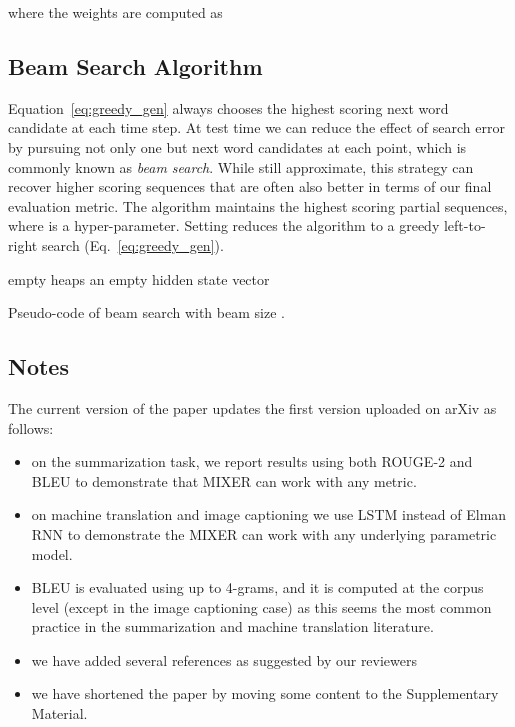 \documentclass{article} \usepackage{iclr2016_conference,times}
\begin{document}
where the weights  are computed as 




\subsection{Beam Search Algorithm}
\label{sup-material:beam_search}
Equation~\ref{eq:greedy_gen} always chooses the highest scoring next word candidate
at each time step. At test time we can reduce the effect of search error 
by pursuing not only one but  next word candidates at each point, which 
is commonly known as {\it beam search}.
While still approximate, this strategy can recover higher scoring sequences 
that are often also better in terms of our final evaluation metric.
The algorithm maintains the  highest scoring partial
sequences, where  is a hyper-parameter.
Setting  reduces the algorithm to a greedy left-to-right search 
(Eq.~\eqref{eq:greedy_gen}). 
\begin{algorithm}[!h]
  empty heaps \;
  an empty hidden state vector \;
  \;
  \;
  \KwOut{}
 
 \caption{Pseudo-code of beam search with beam size .}
  \label{alg:beam} 
\end{algorithm}


\newpage






\subsection{Notes}
The current version of the paper updates the first version uploaded on arXiv as follows:
\begin{itemize}
\item on the summarization task, we report results using both ROUGE-2 and BLEU to demonstrate that MIXER can work with any metric.
\item on machine translation and image captioning we use LSTM instead of Elman RNN to demonstrate the MIXER can work with any underlying parametric model.
\item BLEU is evaluated using up to 4-grams, and it is computed at the corpus level (except in the image captioning case) as this seems the most common practice
in the summarization and machine translation literature.
\item we have added several references as suggested by our reviewers
\item we have shortened the paper by moving some content to the Supplementary Material. 
\end{itemize} 
\end{document}
